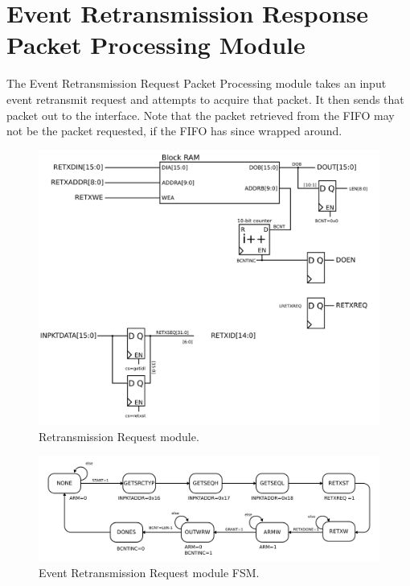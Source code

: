 \section{Event Retransmission Response Packet Processing Module} 

The Event Retransmission Request Packet Processing module takes an input
event retransmit request and attempts to acquire that packet. It then sends
that packet out to the interface. Note that the packet retrieved from
the FIFO may not be the packet requested, if the FIFO has since
wrapped around.

\begin{figure}
\begin{centering}
\includegraphics[scale=0.8]{eventretxresponse.svg}
\end{centering}
\caption{Retransmission Request module.}
\label{eventretxresponse}
\end{figure}

\begin{figure}
\begin{centering}
\includegraphics[scale=0.8]{eventretxresponse.fsm.svg}
\end{centering}
\caption{Event Retransmission Request module FSM.}
\label{eventretxresponse.fsm}
\end{figure}
